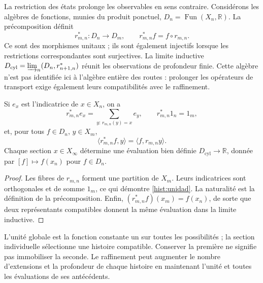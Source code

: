 La restriction des états prolonge les observables en sens contraire.
Considérons les algèbres de fonctions, munies du produit ponctuel,
\(D_n=\operatorname{Fun}(X_n,\mathbb R)\). La précomposition définit
\begin{equation}
 r_{m,n}^*:D_n\longrightarrow D_m,
 \qquad r_{m,n}^*f=f\circ r_{m,n}.
 \label{hist:precomposicion}
\end{equation}
Ce sont des morphismes unitaux ; ils sont également injectifs lorsque les restrictions
correspondantes sont surjectives. La limite inductive
\(D_{\mathrm{cyl}}=\varinjlim_n(D_n,r_{n+1,n}^*)\) réunit les
observations de profondeur finie. Cette algèbre n’est pas identifiée ici
à l’algèbre entière des routes : prolonger les opérateurs de transport exige
également leurs compatibilités avec le raffinement.

\begin{lemma}
Si \(e_x\) est l’indicatrice de \(x\in X_n\), on a
\begin{equation}
 r_{m,n}^*e_x=\sum_{y:\,r_{m,n}(y)=x}e_y,
 \qquad r_{m,n}^*1_n=1_m,
 \label{hist:unidad}
\end{equation}
et, pour tous \(f\in D_n\), \(y\in X_m\),
\[
 \langle r_{m,n}^*f,y\rangle=\langle f,r_{m,n}y\rangle.
\]
Chaque section \(x\in X_\infty\) détermine une évaluation bien définie
\(D_{\mathrm{cyl}}\to\mathbb R\), donnée par \([f]\mapsto f(x_n)\)
pour \(f\in D_n\).
\end{lemma}
\begin{proof}
Les fibres de \(r_{m,n}\) forment une partition de \(X_m\). Leurs
indicatrices sont orthogonales et de somme \(1_m\), ce qui démontre
\eqref{hist:unidad}. La naturalité est la définition de la précomposition.
Enfin, \((r_{m,n}^*f)(x_m)=f(x_n)\), de sorte que deux représentants
compatibles donnent la même évaluation dans la limite inductive.
\end{proof}

L’unité globale est la fonction constante un sur toutes les possibilités ;
la section individuelle sélectionne une histoire compatible. Conserver la
première ne signifie pas immobiliser la seconde. Le raffinement peut augmenter
le nombre d’extensions et la profondeur de chaque histoire en maintenant
l’unité et toutes les évaluations de ses antécédents.


